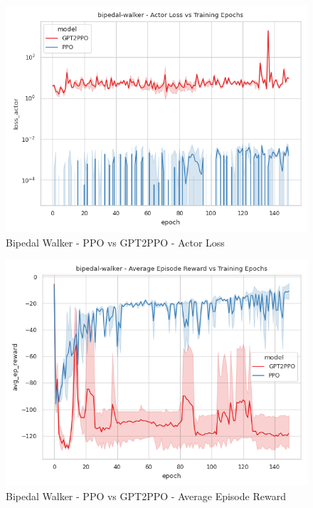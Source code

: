 \documentclass[conference]{IEEEtran}
\begin{document}
\begin{figure}[htbp]
    \centerline{\includegraphics[width=\columnwidth]{./img/bipedal-walker-loss_actor-model.png}}
    \caption{Bipedal Walker - PPO vs GPT2PPO - Actor Loss}
    \label{bipedal-walker-loss_actor-model}
\end{figure}

\begin{figure}[htbp]
    \centerline{\includegraphics[width=\columnwidth]{./img/bipedal-walker-avg_ep_reward-model.png}}
    \caption{Bipedal Walker - PPO vs GPT2PPO - Average Episode Reward}
    \label{bipedal-walker-avg_ep_reward-model}
\end{figure}

\end{document}
